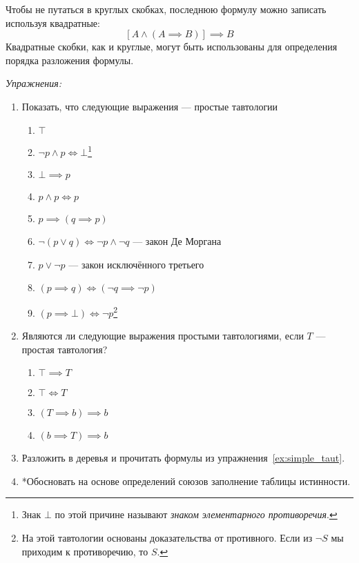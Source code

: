 Чтобы не путаться в круглых скобках, последнюю формулу можно записать используя
квадратные:
\[
  [A\land (A\implies B)]\implies B
\]
Квадратные скобки, как и круглые, могут быть использованы для определения порядка
разложения формулы.

\vspace{1em}
{\it Упражнения:}

\begin{enumerate}
  \item{}Показать, что следующие выражения --- простые тавтологии\label{ex:simple_taut}
  \begin{enumerate}
    \item{}$\top$
    \item{}$\lnot p\land p\iff\bot$\footnote{
    Знак $\bot$ по этой причине называют {\it знаком элементарного противоречия}.
    }
    \item{}$\bot \implies p$
    \item{}$p\land p\iff p$
    \item{}$p\implies (q\implies p)$
    \item{}$\lnot(p\lor q)\iff \lnot p\land \lnot q$
    --- закон Де Моргана
    \item{}$p\lor \lnot p$ --- закон исключённого третьего
    \item{}${(p\implies q)\iff (\lnot q\implies \lnot p)}$
    \item{}$(p\implies\bot)\iff \lnot p$\footnote{
      На этой тавтологии основаны
      доказательства от противного. Если из $\lnot S$ мы приходим
      к противоречию, то $S$.}
  \end{enumerate}
  \item{}Являются ли следующие выражения простыми тавтологиями,
  если $T$ --- простая тавтология?
  \begin{enumerate}
    \item{}$\top \implies T$
    \item{}$\top \iff T$
    \item{}$(T\implies b)\implies b$
    \item{}$(b\implies T)\implies b$
  \end{enumerate}
  \item{}Разложить в деревья и прочитать формулы из упражнения~\ref{ex:simple_taut}.
  \item{}*Обосновать на основе определений союзов заполнение таблицы истинности.
\end{enumerate}

